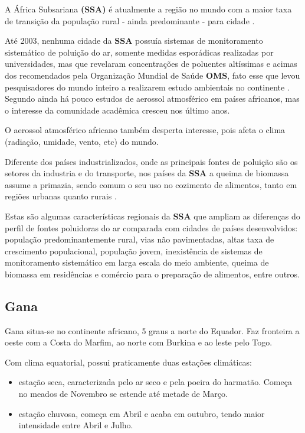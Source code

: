 A África Subsariana \textbf{(SSA)} é atualmente a região no mundo com a maior 
taxa de transição da população rural - ainda predominante - para cidade
\citep{MONTGOMERY2008}. 

Até 2003, nenhuma cidade da \textbf{SSA} possuía sistemas de monitoramento 
sistemático de poluição do ar, somente medidas esporádicas realizadas
por universidades, mas que revelaram concentrações de poluentes altíssimas e 
acimas dos recomendados pela Organização Mundial de Saúde \textbf{OMS},
fato esse que levou pesquisadores do mundo inteiro a 
realizarem estudo ambientais no continente \citep{EZZATI2004}. 
Segundo \cite{aboh2009} ainda há pouco estudos de aerossol atmosférico 
em países africanos, mas o interesse da comunidade acadêmica cresceu
nos último anos.
 
O aerossol atmosférico africano também desperta interesse, pois afeta o clima 
(radiação, umidade, vento, etc) do mundo.

Diferente dos países industrializados, onde as principais fontes de poluição 
são os setores da industria e do transporte, nos países da \textbf{SSA} a 
queima de biomassa assume a primazia, sendo comum o seu uso no cozimento 
de alimentos, tanto em regiões urbanas quanto rurais \citep{SMITH2004}. 

Estas são algumas características regionais da \textbf{SSA} que ampliam as 
diferenças do perfil de fontes poluidoras do ar comparada com cidades 
de países desenvolvidos: população predominantemente rural,
vias não pavimentadas, altas taxa de crescimento populacional, população jovem,
inexistência de sistemas de monitoramento sistemático em larga escala do meio 
ambiente, queima de biomassa em residências e comércio para o preparação
de alimentos, entre outros. 

\subsection{Gana}

Gana situa-se no continente africano, 5 graus a norte do Equador. 
Faz fronteira a oeste com a Costa do Marfim, ao norte com Burkina
e ao leste pelo Togo. 

Com clima equatorial, possui praticamente duas estações climáticas:

\begin{itemize}
  \item estação seca, caracterizada pelo ar seco e pela poeira do harmatão. 
       Começa no meados de Novembro se estende até metade de Março.
 \item estação chuvosa, começa em Abril e acaba em outubro, tendo maior
       intensidade entre Abril e Julho.
\end{itemize}

